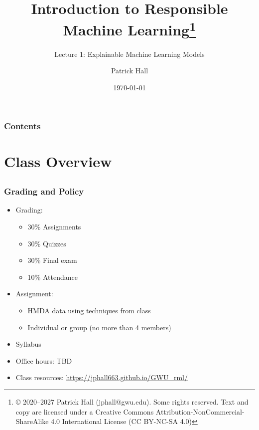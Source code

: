\documentclass[11pt,aspectratio=169,hyperref={colorlinks}]{beamer}
\author{Patrick Hall}
\title{Introduction to Responsible Machine Learning\footnote{\tiny{© 2020–2027 Patrick Hall (jphall@gwu.edu). Some rights reserved. Text and copy are licensed under a Creative Commons Attribution-NonCommercial-ShareAlike 4.0 International License (CC BY-NC-SA 4.0)}}}
\subtitle{Lecture 1: Explainable Machine Learning Models}
\institute{The George Washington University}
\date{\today}
\begin{document}
	
	\maketitle
	
	\begin{frame}
	
		\frametitle{Contents}
		
		\tableofcontents{}
		
	\end{frame}
	

	\section{Class Overview}
	\subsection*{}
	
	\begin{frame}
	
		\frametitle{Grading and Policy}
			
		\begin{itemize}
			\item{Grading:}
				\begin{itemize}
					\item{30\% Assignments}
					\item{30\% Quizzes}
					\item{30\% Final exam}
					\item{10\% Attendance}
				\end{itemize}
			\item{Assignment:}
				\begin{itemize}
					\item{HMDA data using techniques from class}
					\item{Individual or group (no more than 4 members)}
				\end{itemize}
			\item{Syllabus}
			\item{Office hours: TBD}
			\item{Class resources: \url{https://jphall663.github.io/GWU_rml/}}	
		\end{itemize}		
			
	\end{frame}
	
\end{document}
